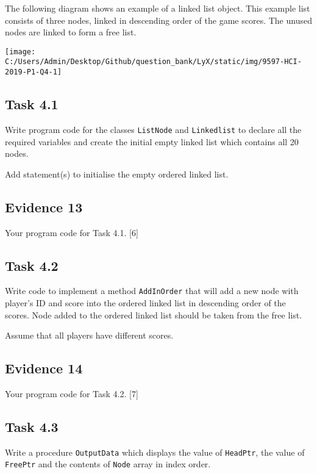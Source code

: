 The following diagram shows an example of a linked list object. This
example list consists of three nodes, linked in descending order of
the game scores. The unused nodes are linked to form a free list.
\begin{center}
\texttt{[image: C:/Users/Admin/Desktop/Github/question\_bank/LyX/static/img/9597-HCI-2019-P1-Q4-1]}
\par\end{center}

\subsection*{Task 4.1}

Write program code for the classes \texttt{ListNode} and \texttt{Linkedlist}
to declare all the required variables and create the initial empty
linked list which contains all 20 nodes.

Add statement(s) to initialise the empty ordered linked list.

\subsection*{Evidence 13 }

Your program code for Task 4.1. \hfill{}{[}6{]}

\subsection*{Task 4.2 }

Write code to implement a method \texttt{AddInOrder} that will add
a new node with player\textquoteright s ID and score into the ordered
linked list in descending order of the scores. Node added to the ordered
linked list should be taken from the free list. 

Assume that all players have different scores.

\subsection*{Evidence 14 }

Your program code for Task 4.2.\hfill{} {[}7{]}

\subsection*{Task 4.3 }

Write a procedure \texttt{OutputData} which displays the value of
\texttt{HeadPtr}, the value of \texttt{FreePtr} and the contents of
\texttt{Node} array in index order.

